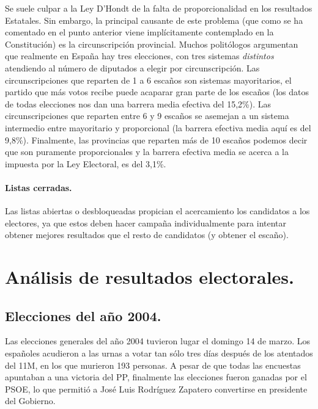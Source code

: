 \documentclass[11pt]{article}
\begin{document}
	Se suele culpar a la Ley D'Hondt de la falta de proporcionalidad en los resultados Estatales. Sin embargo, la principal causante de este problema (que como se ha comentado en el punto anterior viene implícitamente contemplado en la Constitución) es la circunscripción provincial. Muchos politólogos argumentan que realmente en España hay tres elecciones, con tres sistemas \textit{distintos} atendiendo al número de diputados a elegir por circunscripción. Las circunscripciones que reparten de 1 a 6 escaños son sistemas mayoritarios, el partido que más votos recibe puede acaparar gran parte de los escaños (los datos de todas elecciones nos dan una barrera media efectiva del 15,2\%). Las circunscripciones que reparten entre 6 y 9 escaños se asemejan a un sistema intermedio entre mayoritario y proporcional (la barrera efectiva media aquí es del 9,8\%). Finalmente, las provincias que reparten más de 10 escaños podemos decir que son puramente proporcionales y la barrera efectiva media se acerca a la impuesta por la Ley Electoral, es del 3,1\%.
	
	\paragraph{Listas cerradas.}
	
	Las listas abiertas o desbloqueadas propician el acercamiento los candidatos a los electores, ya que estos deben hacer campaña individualmente para intentar obtener mejores resultados que el resto de candidatos (y obtener el escaño).
	

	
	\newpage
	
	\section{Análisis de resultados electorales.}
	\subsection{Elecciones del año 2004.}
	
	Las elecciones generales del año 2004 tuvieron lugar el domingo 14 de marzo. Los españoles acudieron a las urnas a votar tan sólo tres días después de los atentados del 11M, en los que murieron 193 personas. A pesar de que todas las encuestas apuntaban a una victoria del PP, finalmente las elecciones fueron ganadas por el PSOE, lo que permitió a José Luis Rodríguez Zapatero convertirse en presidente del Gobierno.
	
\end{document}
